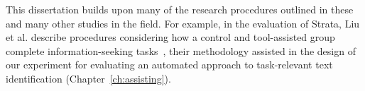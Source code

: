 This dissertation builds upon many of the research procedures outlined 
in these and many other studies in the field. 
For example, in the evaluation of Strata, 
 Liu et al. describe procedures 
considering how a control and tool-assisted group 
complete information-seeking tasks~\cite{liu2021},
their methodology assisted in the design of our experiment for 
evaluating an automated approach to
task-relevant text identification (Chapter~\ref{ch:assisting}).
